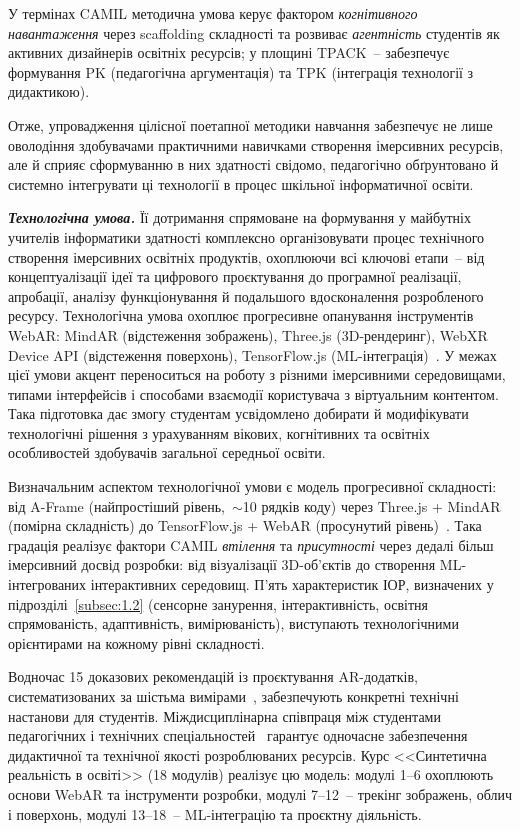 У термінах CAMIL методична умова керує фактором \emph{когнітивного навантаження} через scaffolding складності та розвиває \emph{агентність} студентів як активних дизайнерів освітніх ресурсів; у площині TPACK~-- забезпечує формування PK (педагогічна аргументація) та TPK (інтеграція технології з дидактикою).

Отже, упровадження цілісної поетапної методики навчання забезпечує не лише оволодіння здобувачами практичними навичками створення імерсивних ресурсів, але й сприяє сформуванню в них здатності свідомо, педагогічно обґрунтовано й системно інтегрувати ці технології в процес шкільної інформатичної освіти.

\emph{\textbf{Технологічна умова.}} Її дотримання спрямоване на формування у майбутніх учителів інформатики здатності комплексно організовувати процес технічного створення імерсивних освітніх продуктів, охоплюючи всі ключові етапи~-- від концептуалізації ідеї та цифрового проєктування до програмної реалізації, апробації, аналізу функціонування й подальшого вдосконалення розробленого ресурсу. Технологічна умова охоплює прогресивне опанування інструментів WebAR: MindAR (відстеження зображень), Three.js (3D-рендеринг), WebXR Device API (відстеження поверхонь), TensorFlow.js (ML-інтеграція)~\cite{Shepiliev2020WebAR, Semerikov2024WebARML_CoSinE}. У межах цієї умови акцент переноситься на роботу з різними імерсивними середовищами, типами інтерфейсів і способами взаємодії користувача з віртуальним контентом. Така підготовка дає змогу студентам усвідомлено добирати й модифікувати технологічні рішення з урахуванням вікових, когнітивних та освітніх особливостей здобувачів загальної середньої освіти.

Визначальним аспектом технологічної умови є модель прогресивної складності: від A-Frame (найпростіший рівень,~$\sim$10 рядків коду) через Three.js + MindAR (помірна складність) до TensorFlow.js + WebAR (просунутий рівень)~\cite{Semerikov2024WebAR_EduDim}. Така градація реалізує фактори CAMIL \emph{втілення} та \emph{присутності} через дедалі більш імерсивний досвід розробки: від візуалізації 3D-об'єктів до створення ML-інтегрованих інтерактивних середовищ. П'ять характеристик ІОР, визначених у підрозділі~\ref{subsec:1.2} (сенсорне занурення, інтерактивність, освітня спрямованість, адаптивність, вимірюваність), виступають технологічними орієнтирами на кожному рівні складності.

Водночас 15 доказових рекомендацій із проєктування AR-додатків, систематизованих за шістьма вимірами~\cite{GonnermannMuller2024ARDesign}, забезпечують конкретні технічні настанови для студентів. Міждисциплінарна співпраця між студентами педагогічних і технічних спеціальностей~\cite{Oberdorfer2021Interdisciplinary} гарантує одночасне забезпечення дидактичної та технічної якості розроблюваних ресурсів. Курс <<Синтетична реальність в освіті>> (18 модулів) реалізує цю модель: модулі 1--6 охоплюють основи WebAR та інструменти розробки, модулі 7--12~-- трекінг зображень, облич і поверхонь, модулі 13--18~-- ML-інтеграцію та проєктну діяльність.


